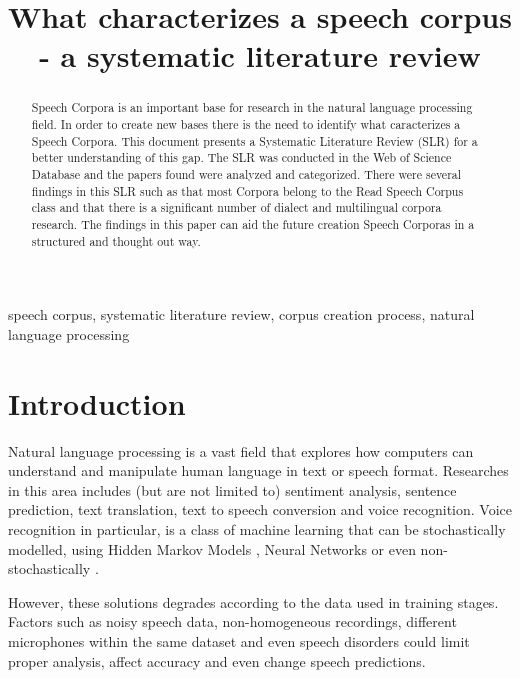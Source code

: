 \documentclass[conference]{IEEEtran}
\begin{document}
\title{What characterizes a speech corpus - a systematic literature review}
\author{
}
\maketitle

\begin{abstract}
Speech Corpora is an important base for research in the natural language processing field. In order to create new bases there is the need to identify what caracterizes a Speech Corpora. 
This document presents a Systematic Literature Review (SLR) for a better understanding of this gap. The SLR was conducted in the Web of Science Database and the papers found were analyzed and categorized. There were several findings in this SLR such as that most Corpora belong to the Read Speech Corpus class and that there is a significant number of dialect and multilingual corpora research. The findings in this paper can aid the future creation Speech Corporas in a structured and thought out way. 
\end{abstract}

\begin{IEEEkeywords}
speech corpus, systematic literature review, corpus creation process, natural language processing
\end{IEEEkeywords}

\section[Introduction]{Introduction}

Natural language processing is a vast field that explores how computers can understand and manipulate human language in text or speech format. Researches in this area includes (but are not limited to) sentiment analysis, sentence prediction, text translation, text to speech conversion and voice recognition. Voice recognition in particular, is a class of machine learning that can be stochastically modelled, using Hidden Markov Models \cite{gales2008application}, Neural Networks \cite{graves2013speech} or even non-stochastically \cite{burget2003nonrandomattr}.

However, these solutions degrades according to the data used in training stages. Factors such as noisy speech data, non-homogeneous recordings, different microphones within the same dataset and even speech disorders could limit proper analysis, affect accuracy and even change speech predictions. 
\end{document}
